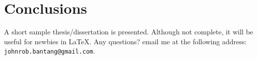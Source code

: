 \chapter{Conclusions}

\hspace{\parindent} A short sample thesis/dissertation is
presented. Although not complete, it will be useful for newbies in
\LaTeX. Any questions? email me at the following address:
\verb+johnrob.bantang@gmail.com+.
